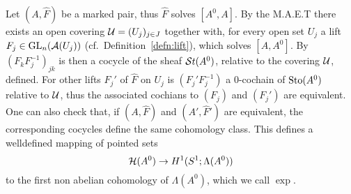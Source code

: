 Let $(A,\hat F)$ be a marked pair, thus $\hat F$ solves $[A^0,A]$.
By the M.A.E.T there exists an open covering $\mathcal{U}=(U_j)_{j\in J}$ together
with, for every open set $U_j$ a lift $F_j\in\operatorname{GL}_n(\mathcal{A}(U_j))$
(cf.\ Definition~\ref{defn:lift}), which solves $[A,A^0]$.
By $(F_kF_j^{-1})_{jk}$ is then a cocycle of the sheaf $\mathcal{S}{}t(A^0)$, relative to
the covering $\mathcal{U}$, defined.
For other lifts $F_j'$ of $\hat F$ on $U_j$ is $(F_j'F_j^{-1})$ a $0$-cochain
of $\operatorname{Sto}(A^0)$ relative to $\mathcal{U}$, thus the associated cochians to $(F_j)$ and
$(F_j')$ are equivalent.
One can also check that, if $(A,\hat F)$ and $(A',\hat F')$ are equivalent, the
corresponding cocycles define the same cohomology class.
This defines a welldefined mapping of pointed sets
\[
  \mathcal{H}(A^0)\to H^1(S^1;\Lambda(A^0))
\]
to the first non abelian cohomology of $\Lambda(A^0)$, which we call $\exp$.

